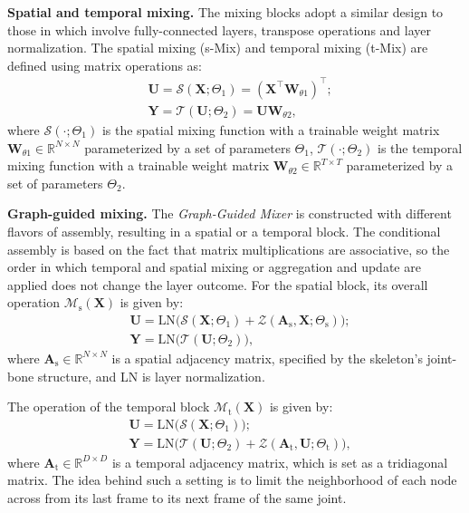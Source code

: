 \documentclass[10pt,twocolumn,letterpaper]{article}
\begin{document}
    


\noindent\textbf{Spatial and temporal mixing.}
The mixing blocks adopt a similar design to those in \cite{tolstikhin2021mlp,guo2023back} which involve fully-connected layers, transpose operations and layer normalization. The spatial mixing (s-Mix) and temporal mixing (t-Mix) are defined using matrix operations as:
\begin{equation}\label{basic mixing}
\begin{split}
    &\mathbf{U} = \mathcal{S} (\mathbf{X}; \Theta_1) = (  \mathbf{X}^\top\mathbf{W}_{\theta1} )^\top ;\\
    &\mathbf{Y} = \mathcal{T} (\mathbf{U}; \Theta_2) =  \mathbf{U}\mathbf{W}_{\theta2} ,
\end{split}
\end{equation}
where $\mathcal{S}(\cdot; \Theta_1)$ is the spatial mixing function with a trainable weight matrix $\mathbf{W}_{\theta1}\in\mathbb{R}^{N\times N}$ parameterized by a set of parameters $\Theta_1$, $\mathcal{T}(\cdot; \Theta_2)$ is the temporal mixing function with a trainable weight matrix $\mathbf{W}_{\theta2}\in\mathbb{R}^{T\times T}$ parameterized by a set of parameters $\Theta_2$.


\noindent\textbf{Graph-guided mixing.}
The \textit{Graph-Guided Mixer} is constructed with different flavors of assembly, resulting in a spatial or a temporal block.
The conditional assembly is based on the fact that matrix multiplications are associative, so the order in which temporal and spatial mixing or aggregation and update are applied does not change the layer outcome.
For the spatial block, its overall operation $\mathcal{M}_\text{s}(\mathbf{X})$ is given by:
\begin{equation}\label{spatial meta mixer}
    \begin{split}
        &\mathbf{U} = \text{LN} \big(  \mathcal{S} (\mathbf{X}; \Theta_1) + \mathcal{Z}(\mathbf{A}_\text{s}, \mathbf{X}; \Theta_\text{s})   \big) ;\\
        &\mathbf{Y} = \text{LN} \big( \mathcal{T} (\mathbf{U}; \Theta_2) \big),
    \end{split}
\end{equation}
where $\mathbf{A}_\text{s} \in\mathbb{R}^{N\times N}$ is a spatial adjacency matrix, specified by the skeleton's joint-bone structure, and LN is layer normalization.

The operation of the temporal block $\mathcal{M}_\text{t}(\mathbf{X})$ is given by:
\begin{equation}\label{temporal meta mixer}
    \begin{split}
        &\mathbf{U} = \text{LN} \big(  \mathcal{S} (\mathbf{X}; \Theta_1) \big);\\
        &\mathbf{Y} = \text{LN} \big(     \mathcal{T} (\mathbf{U}; \Theta_2) +    \mathcal{Z}(\mathbf{A}_\text{t}, \mathbf{U}; \Theta_\text{t})         \big),
    \end{split}
\end{equation}
where $\mathbf{A}_\text{t} \in\mathbb{R}^{D\times D}$ is a temporal adjacency matrix, which is set as a tridiagonal matrix. The idea behind such a setting is to limit the neighborhood of each node across from its last frame to its next frame of the same joint.
\end{document}
